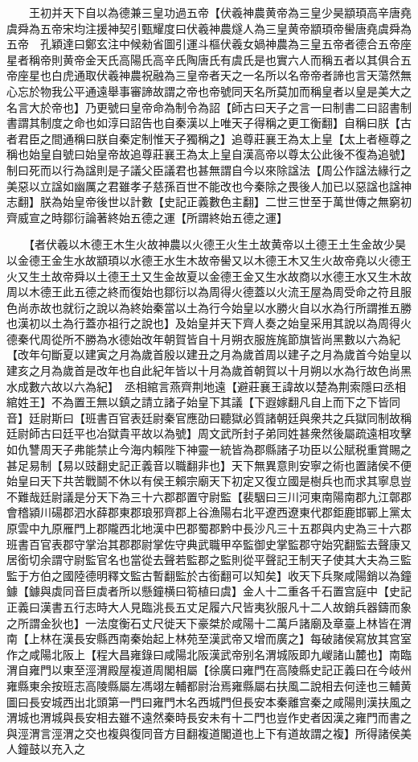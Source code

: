 　　王初并天下自以為德兼三皇功過五帝【伏羲神農黄帝為三皇少昊顓頊高辛唐堯虞舜為五帝宋均注援神契引甄耀度曰伏羲神農燧人為三皇黄帝顓頊帝嚳唐堯虞舜為五帝　孔穎達曰鄭玄注中候勑省圖引運斗樞伏羲女媧神農為三皇五帝者德合五帝座星者稱帝則黄帝金天氏高陽氏高辛氏陶唐氏有虞氏是也實六人而稱五者以其俱合五帝座星也白虎通取伏羲神農祝融為三皇帝者天之一名所以名帝帝者諦也言天蕩然無心忘於物我公平通遠舉事審諦故謂之帝也帝號同天名所莫加而稱皇者以皇是美大之名言大於帝也】乃更號曰皇帝命為制令為詔【師古曰天子之言一曰制書二曰詔書制書謂其制度之命也如淳曰詔告也自秦漢以上唯天子得稱之更工衡翻】自稱曰朕【古者君臣之間通稱曰朕自秦定制惟天子獨稱之】追尊莊襄王為太上皇【太上者極尊之稱也始皇自號曰始皇帝故追尊莊襄王為太上皇自漢高帝以尊太公此後不復為追號】制曰死而以行為諡則是子議父臣議君也甚無謂自今以來除諡法【周公作諡法緣行之美惡以立諡如幽厲之君雖孝子慈孫百世不能改也今秦除之畏後人加已以惡諡也諡神志翻】朕為始皇帝後世以計數【史記正義數色主翻】二世三世至于萬世傳之無窮初齊威宣之時鄒衍論著終始五德之運【所謂終始五德之運】

　　【者伏羲以木德王木生火故神農以火德王火生土故黄帝以土德王土生金故少昊以金德王金生水故顓頊以水德王水生木故帝嚳又以木德王木又生火故帝堯以火德王火又生土故帝舜以土德王土又生金故夏以金德王金又生水故商以水德王水又生木故周以木德王此五德之終而復始也鄒衍以為周得火德蓋以火流王屋為周受命之符且服色尚赤故也就衍之說以為終始秦當以土為行今始皇以水勝火自以水為行所謂推五勝也漢初以土為行蓋亦祖行之說也】及始皇并天下齊人奏之始皇采用其說以為周得火德秦代周從所不勝為水德始改年朝賀皆自十月朔衣服旌旄節旗皆尚黑數以六為紀【改年句斷夏以建寅之月為歲首殷以建丑之月為歲首周以建子之月為歲首今始皇以建亥之月為歲首是改年也自此紀年皆以十月為歲首朝賀以十月朔以水為行故色尚黑水成數六故以六為紀】　丞相綰言燕齊荆地遠【避莊襄王諱故以楚為荆索隱曰丞相綰姓王】不為置王無以鎮之請立諸子始皇下其議【下遐嫁翻凡自上而下之下皆同音】廷尉斯曰【班書百官表廷尉秦官應劭曰聽獄必質諸朝廷與衆共之兵獄同制故稱廷尉師古曰廷平也冶獄貴平故以為號】周文武所封子弟同姓甚衆然後屬疏遠相攻擊如仇讐周天子弗能禁止今海内賴陛下神靈一統皆為郡縣諸子功臣以公賦税重賞賜之甚足易制【易以豉翻史記正義音以職翻非也】天下無異意則安寧之術也置諸侯不便始皇曰天下共苦戰鬬不休以有侯王賴宗廟天下初定又復立國是樹兵也而求其寧息豈不難哉廷尉議是分天下為三十六郡郡置守尉監【裴駰曰三川河東南陽南郡九江鄣郡會稽潁川碭郡泗水薛郡東郡琅邪齊郡上谷漁陽右北平遼西遼東代郡鉅鹿邯鄲上黨太原雲中九原雁門上郡隴西北地漢中巴郡蜀郡黔中長沙凡三十五郡與内史為三十六郡班書百官表郡守掌治其郡郡尉掌佐守典武職甲卒監御史掌監郡守始究翻監去聲康又居銜切余謂守尉監官名也當從去聲若監郡之監則從平聲記王制天子使其大夫為三監監于方伯之國陸德明釋文監古暫翻監於古銜翻可以知矣】收天下兵聚咸陽銷以為鐘鐻【鐻與虡同音巨虡者所以懸鐘横曰筍植曰虞】金人十二重各千石置宫庭中【史記正義曰漢書五行志時大人見臨洮長五丈足履六尺皆夷狄服凡十二人故銷兵器鑄而象之所謂金狄也】一法度衡石丈尺徙天下豪桀於咸陽十二萬戶諸廟及章臺上林皆在渭南【上林在漢長安縣西南秦始起上林苑至漢武帝又增而廣之】每破諸侯寫放其宫室作之咸陽北阪上【程大昌雍錄曰咸陽北阪漢武帝别名渭城阪即九嵕諸山麓也】南臨渭自雍門以東至涇渭殿屋複道周閣相屬【徐廣曰雍門在高陵縣史記正義曰在今岐州雍縣東余按班志高陵縣屬左馮翊左輔都尉治焉雍縣屬右扶風二說相去何逹也三輔黄圖曰長安城西出北頭第一門曰雍門木名西城門但長安本秦離宫秦之咸陽則漢扶風之渭城也渭城與長安相去雖不遠然秦時長安未有十二門也豈作史者因漢之雍門而書之與涇渭言涇渭之交也複與復同音方目翻複道閣道也上下有道故謂之複】所得諸侯美人鐘鼓以充入之


